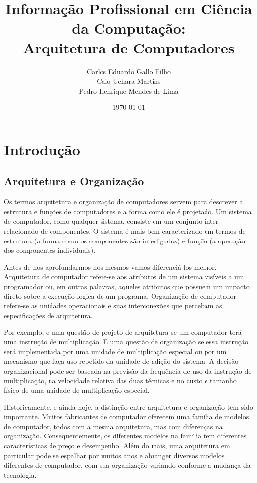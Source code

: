 \documentclass{article}
\title{Informação Profissional em Ciência da Computação:\\
       Arquitetura de Computadores}
\author{Carlos Eduardo Gallo Filho \\
        Caio Uehara Martins\\
        Pedro Henrique Mendes de Lima}
\date{\today}
\begin{document}
\maketitle

\section{Introdução}
\subsection{Arquitetura e Organização}
Os termos arquitetura e organização de computadores servem para descrever a
estrutura e funções de computadores e a forma como ele é projetado. Um sistema
de computador, como qualquer sistema, consiste em um conjunto inter-relacionado
de componentes. O sistema é mais bem caracterizado em termos de estrutura (a
forma como os componentes são interligados) e função (a operação dos
componentes individuais).

Antes de nos aprofundarmos nos mesmos vamos diferenciá-los melhor. Arquitetura
de computador refere-se aos atributos de um sistema visíveis a um programador
ou, em outras palavras, aqueles atributos que possuem um impacto direto sobre a
execução logica de um programa. Organização de computador refere-se as unidades
operacionais e suas interconexões que percebam as especificações de
arquitetura. 

Por exemplo, e uma questão de projeto de arquitetura se um computador terá uma
instrução de multiplicação. E uma questão de organização se essa instrução será
implementada por uma unidade de multiplicação especial ou por um mecanismo que
faça uso repetido da unidade de adição do sistema. A decisão organizacional
pode ser baseada na previsão da frequência de uso da instrução de
multiplicação, na velocidade relativa das duas técnicas e no custo e tamanho
físico de uma unidade de multiplicação especial.

Historicamente, e ainda hoje, a distinção entre arquitetura e organização tem
sido importante. Muitos fabricantes de computador oferecem uma família de
modelos de computador, todos com a mesma arquitetura, mas com diferenças na
organização. Consequentemente, os diferentes modelos na família tem diferentes
características de preço e desempenho. Além do mais, uma arquitetura em
particular pode se espalhar por muitos anos e abranger diversos modelos
diferentes de computador, com sua organização variando conforme a mudança da
tecnologia.
\end{document}
